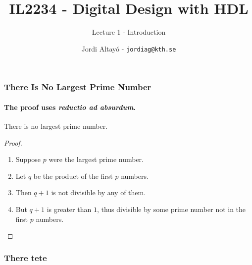\documentclass[notes,aspectratio=169]{beamer}
\title{IL2234 - Digital Design with HDL}
\subtitle{Lecture 1 - Introduction}
\author[J. Altayó]{Jordi Altayó - \texttt{jordiag@kth.se}}
\begin{document}
\begin{frame}[plain]
\titlepage
\end{frame}

\begin{frame}
\frametitle{There Is No Largest Prime Number}
\framesubtitle{The proof uses \textit{reductio ad absurdum}.}
\begin{theorem}
There is no largest prime number.
\end{theorem}
\begin{proof}
\begin{enumerate}
\item<1-| alert@1> Suppose $p$ were the largest prime number.
\item<2-> Let $q$ be the product of the first $p$ numbers.
\item<3-> Then $q+1$ is not divisible by any of them.
\item<1-> But $q+1$ is greater than $1$, thus divisible by some prime number not in the first $p$ numbers.
  \end{enumerate}
\end{proof}
\end{frame}

\begin{frame}
  \frametitle{There tete}
\end{frame}
\end{document}

